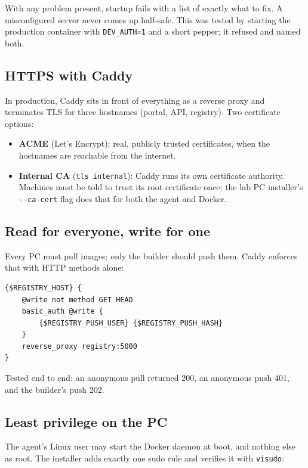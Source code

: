 With any problem present, startup fails with a list of exactly what to fix. A
misconfigured server never comes up half-safe. This was tested by starting the
production container with \texttt{DEV\_AUTH=1} and a short pepper; it refused
and named both.

\subsection{HTTPS with Caddy}

In production, Caddy sits in front of everything as a reverse proxy and
terminates TLS for three hostnames (portal, API, registry). Two certificate
options:

\begin{itemize}
\item \textbf{ACME} (Let's Encrypt): real, publicly trusted certificates,
  when the hostnames are reachable from the internet.
\item \textbf{Internal CA} (\texttt{tls internal}): Caddy runs its own
  certificate authority. Machines must be told to trust its root certificate
  once; the lab PC installer's \verb|--ca-cert| flag does that for both the
  agent and Docker.
\end{itemize}

\subsection{Read for everyone, write for one}

Every PC must pull images; only the builder should push them. Caddy enforces
that with HTTP methods alone:

\begin{verbatim}
{$REGISTRY_HOST} {
    @write not method GET HEAD
    basic_auth @write {
        {$REGISTRY_PUSH_USER} {$REGISTRY_PUSH_HASH}
    }
    reverse_proxy registry:5000
}
\end{verbatim}

Tested end to end: an anonymous pull returned 200, an anonymous push 401, and
the builder's push 202.

\subsection{Least privilege on the PC}

The agent's Linux user may start the Docker daemon at boot, and nothing else as
root. The installer adds exactly one sudo rule and verifies it with
\texttt{visudo}:


